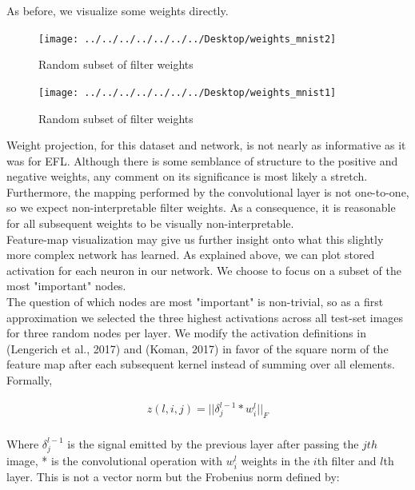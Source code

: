 \documentclass[12pt]{article}
\begin{document}
\pagebreak

As before, we visualize some weights directly.

\begin{figure}[h]
\centering
\texttt{[image: ../../../../../../../Desktop/weights\_mnist2]}
\caption{Random subset of filter weights}
\label{fig:weightsmnist2}
\end{figure}

\begin{figure}[h]
\centering
\texttt{[image: ../../../../../../../Desktop/weights\_mnist1]}
\caption{Random subset of filter weights}
\label{fig:weightsmnist1}
\end{figure}




Weight projection, for this dataset and network, is not nearly as informative as it was for EFL. Although there is some semblance of structure to the positive and negative weights, any comment on its significance is most likely a stretch. Furthermore, the mapping performed by the convolutional layer is not one-to-one, so we expect non-interpretable filter weights. As a consequence, it is reasonable for all subsequent weights to be visually non-interpretable. \\


Feature-map visualization may give us further insight onto what this slightly more complex network has learned. As explained above, we can plot stored activation for each neuron in our network. We choose to focus on a subset of the most "important" nodes. \\

The question of which nodes are most "important" is non-trivial, so as a first approximation we selected the three highest activations across all test-set images for three random nodes per layer. We modify the activation definitions in (Lengerich et al., 2017) \cite{resampling} and (Koman, 2017) \cite{koman} in favor of the square norm of the feature map after each subsequent kernel instead of summing over all elements. Formally,

\begin{align*}
	z(l, i, j) = ||\delta_j^{l-1} * w_{i}^l||_F\\
\end{align*}

Where $\delta_j^{l - 1}$ is the signal emitted by the previous layer after passing the $j th$ image, * is the convolutional operation with $w_i^l$ weights in the $i$th filter and $l$th layer. This is not a vector norm but the Frobenius norm defined by: \\
\end{document}
